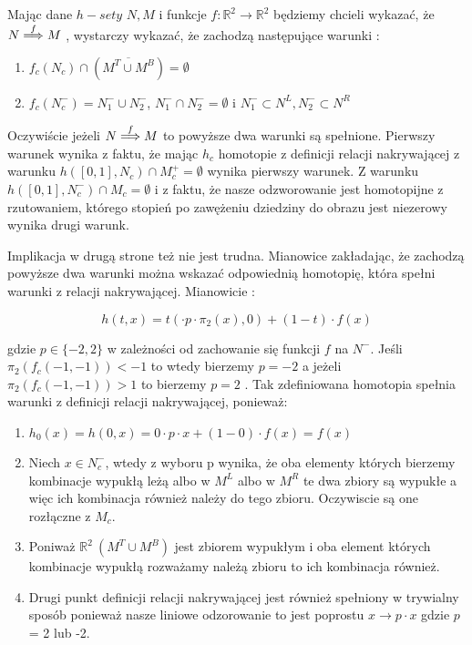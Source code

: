 Mając dane $ h-sety $ $ N,M $ i funkcje $ f : \mathbb R^2 \to \mathbb R^2 $ będziemy chcieli wykazać, że  $N \stackrel{f}{\Longrightarrow} M$ , wystarczy 
wykazać, że zachodzą następujące warunki :
\begin{enumerate}
 \item $ f_c(N_c) \cap ( \overline{M^T \cup M^B} ) = \emptyset $
 \item $ f_c(N^-_c) = N^{-}_1 \cup N^{-}_2 $, $ N^{-}_1 \cap N^{-}_2 = \emptyset $ i $ N^-_1 \subset N^L , N^-_2 \subset N^R $ 
\end{enumerate}

Oczywiście jeżeli $ N \stackrel{f}{\Longrightarrow} M $ to powyższe dwa warunki są spełnione.
Pierwszy warunek wynika z faktu, że mając $h_c $ homotopie z definicji relacji nakrywającej z warunku 
$ h([0,1],N_c) \cap M^+_c = \emptyset $ wynika pierwszy warunek. Z warunku $ h([0,1],N^-_c) \cap M_c = \emptyset $ i z faktu, że nasze 
odzworowanie jest homotopijne z rzutowaniem, którego stopień po zawężeniu dziedziny do obrazu jest niezerowy wynika drugi warunk.

Implikacja w drugą strone też nie jest trudna. Mianowice zakładając, że zachodzą powyższe dwa warunki można wskazać odpowiednią homotopię,
która spełni warunki z relacji nakrywającej.
Mianowicie :

$$
  h(t,x) = t( \cdot p \cdot \pi_2(x),0) + (1-t)\cdot f(x)
$$

gdzie $ p \in \{-2,2\} $ w zależności od zachowanie się funkcji $ f $ na $ N^-$. Jeśli $ \pi_2(f_c( -1,-1)) < -1 $ to wtedy bierzemy $ p = -2 $ 
a jeżeli $ \pi_2(f_c( -1,-1)) > 1 $  to bierzemy $ p = 2 $ . 
Tak zdefiniowana homotopia spełnia warunki z definicji relacji nakrywającej, ponieważ:
\begin{enumerate}
 \item $ h_0(x) = h(0,x) = 0 \cdot p \cdot x + (1-0) \cdot f(x) = f(x) $
 \item Niech $ x \in N^-_c $, wtedy z wyboru p wynika, że oba elementy których bierzemy kombinacje wypukłą leżą albo w $ M^L $ albo w $ M^R$ 
 te dwa zbiory są wypukłe a więc ich kombinacja również należy do tego zbioru. Oczywiscie są one rozłączne z $ M_c$.
 \item Poniważ $ \mathbb R^2 \ (M^T \cup M^B) $ jest zbiorem wypukłym i oba element których kombinacje wypukłą rozważamy należą 
 zbioru to ich kombinacja również.
 \item Drugi punkt definicji relacji nakrywającej jest również spełniony w trywialny sposób ponieważ nasze liniowe odzorowanie to jest poprostu
 $ x \to p \cdot x $ gdzie $ p $ = 2 lub -2.
\end{enumerate}

